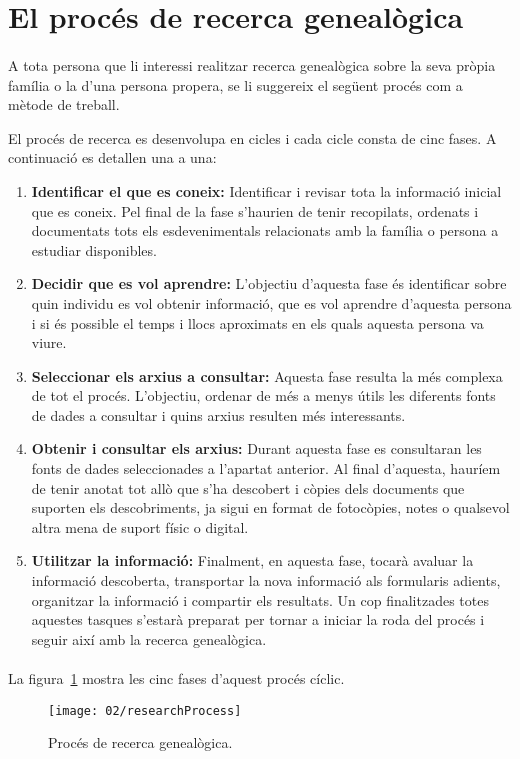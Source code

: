 \section{El procés de recerca genealògica}

    \paragraph{}
    A tota persona que li interessi realitzar recerca genealògica sobre la seva pròpia família o la d'una persona propera, se li suggereix el següent procés com a mètode de treball.

    El procés de recerca es desenvolupa en cicles i cada cicle consta de cinc fases. A continuació es detallen una a una:

    \begin{enumerate}
        \item \textbf{Identificar el que es coneix:} Identificar i revisar tota la informació inicial que es coneix. Pel final de la fase s’haurien de tenir recopilats, ordenats i documentats tots els esdevenimentals relacionats amb la família o persona a estudiar disponibles.
        \item \textbf{Decidir que es vol aprendre:} L’objectiu d’aquesta fase és identificar sobre quin individu es vol obtenir informació, que es vol aprendre d’aquesta persona i si és possible el temps i llocs aproximats en els quals aquesta persona va viure.
        \item \textbf{Seleccionar els arxius a consultar:} Aquesta fase resulta la més complexa de tot el procés. L’objectiu, ordenar de més a menys útils les diferents fonts de dades a consultar i quins arxius resulten més interessants.
        \item \textbf{Obtenir i consultar els arxius:} Durant aquesta fase es consultaran les fonts de dades seleccionades a l’apartat anterior. Al final d’aquesta, hauríem de tenir anotat tot allò que s’ha descobert i còpies dels documents que suporten els descobriments, ja sigui en format de fotocòpies, notes o qualsevol altra mena de suport físic o digital.
        \item \textbf{Utilitzar la informació:} Finalment, en aquesta fase, tocarà avaluar la informació descoberta, transportar la nova informació als formularis adients, organitzar la informació i compartir els resultats. Un cop finalitzades totes aquestes tasques s'estarà preparat per tornar a iniciar la roda del procés i seguir així amb la recerca genealògica.
    \end{enumerate}

    \paragraph{}
    La figura~\ref{fig:researchProcess} mostra les cinc fases d'aquest procés cíclic.

    \begin{figure}[h]
            \texttt{[image: 02/researchProcess]}
            \centering
            \caption{Procés de recerca genealògica.\label{fig:researchProcess}}
    \end{figure}
